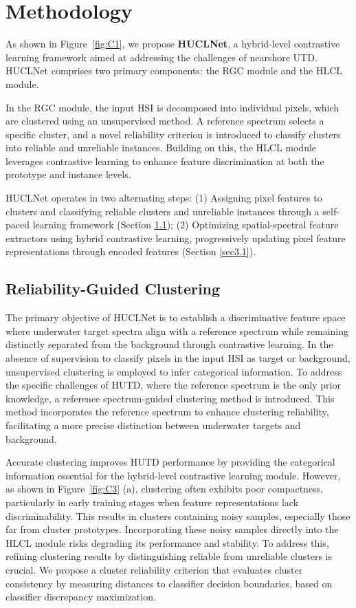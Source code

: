 \section{Methodology}\label{sec:4}
As shown in Figure~\ref{fig:C1}, we propose \textbf{HUCLNet}, a hybrid-level contrastive learning framework aimed at addressing the challenges of nearshore UTD. 
HUCLNet comprises two primary components: the RGC module and the HLCL module.
\par
In the RGC module, the input HSI is decomposed into individual pixels, which are clustered using an unsupervised method. 
A reference spectrum selects a specific cluster, and a novel reliability criterion is introduced to classify clusters into reliable and unreliable instances.
Building on this, the HLCL module leverages contrastive learning to enhance feature discrimination at both the prototype and instance levels. 
\par
HUCLNet operates in two alternating steps: 
(1) Assigning pixel features to clusters and classifying reliable clusters and unreliable instances through a self-paced learning framework (Section \ref{sec3.2}); 
(2) Optimizing spatial-spectral feature extractors using hybrid contrastive learning, progressively updating pixel feature representations through encoded features (Section \ref{sec3.1}).
\par
\subsection{Reliability-Guided Clustering}\label{sec3.2}
The primary objective of HUCLNet is to establish a discriminative feature space where underwater target spectra align with a reference spectrum while remaining distinctly separated from the background through contrastive learning. 
In the absence of supervision to classify pixels in the input HSI as target or background, unsupervised clustering is employed to infer categorical information. 
To address the specific challenges of HUTD, where the reference spectrum is the only prior knowledge, a reference spectrum-guided clustering method is introduced. 
This method incorporates the reference spectrum to enhance clustering reliability, facilitating a more precise distinction between underwater targets and background.

Accurate clustering improves HUTD performance by providing the categorical information essential for the hybrid-level contrastive learning module. 
However, as shown in Figure~\ref{fig:C3} (a), clustering often exhibits poor compactness, particularly in early training stages when feature representations lack discriminability. 
This results in clusters containing noisy samples, especially those far from cluster prototypes. 
Incorporating these noisy samples directly into the HLCL module risks degrading its performance and stability. 
To address this, refining clustering results by distinguishing reliable from unreliable clusters is crucial. 
We propose a cluster reliability criterion that evaluates cluster consistency by measuring distances to classifier decision boundaries, based on classifier discrepancy maximization.

